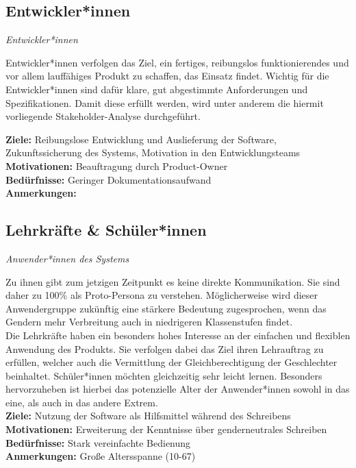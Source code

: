 \documentclass[paper=a4, parskip=half]{scrreprt}
\begin{document}
\subsection{Entwickler*innen}
\vspace{-0.5cm}\textit{Entwickler*innen}

Entwickler*innen verfolgen das Ziel, ein fertiges, reibungslos funktionierendes und vor allem lauffähiges Produkt zu schaffen, das Einsatz findet.
Wichtig für die Entwickler*innen sind dafür klare, gut abgestimmte Anforderungen und Spezifikationen. Damit diese erfüllt werden, wird unter anderem die hiermit vorliegende Stakeholder-Analyse durchgeführt.

\textbf{Ziele:} Reibungslose Entwicklung und Auslieferung der Software, Zukunftssicherung des Systems, Motivation in den Entwicklungsteams\\
\textbf{Motivationen:} Beauftragung durch Product-Owner\\
\textbf{Bedürfnisse:} Geringer Dokumentationsaufwand \\
\textbf{Anmerkungen:}\\

\subsection{Lehrkräfte \& Schüler*innen}
\vspace{-0.5cm}\textit{Anwender*innen des Systems}

Zu ihnen gibt zum jetzigen Zeitpunkt es keine direkte Kommunikation. Sie sind daher zu 100\% als Proto-Persona zu verstehen.
Möglicherweise wird dieser Anwendergruppe zukünftig eine stärkere Bedeutung zugesprochen, wenn das Gendern mehr Verbreitung auch in niedrigeren Klassenstufen findet.\\
Die Lehrkräfte haben ein besonders hohes Interesse an der einfachen und flexiblen Anwendung des Produkts. Sie verfolgen dabei das Ziel ihren Lehrauftrag zu erfüllen, welcher auch die Vermittlung der Gleichberechtigung der Geschlechter beinhaltet. Schüler*innen möchten gleichzeitig sehr leicht lernen. Besonders hervorzuheben ist hierbei das potenzielle Alter der Anwender*innen sowohl in das eine, als auch in das andere Extrem.\\

\textbf{Ziele:} Nutzung der Software als Hilfsmittel während des Schreibens\\
\textbf{Motivationen:} Erweiterung der Kenntnisse über genderneutrales Schreiben\\
\textbf{Bedürfnisse:} Stark vereinfachte Bedienung\\
\textbf{Anmerkungen:} Große Altersspanne (10-67)\\
\end{document}
